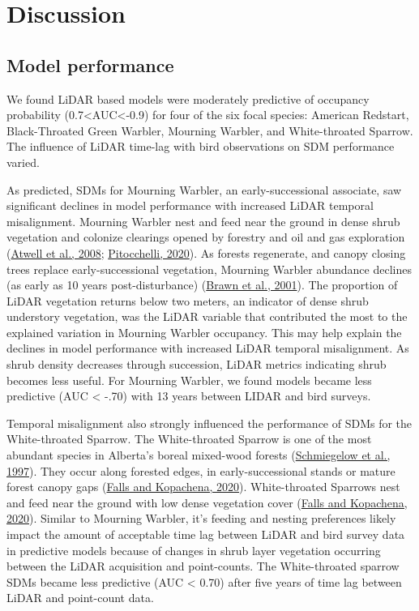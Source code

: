 \documentclass[
  12pt,
]{article}
\begin{document}
\hypertarget{discussion}{%
\section{Discussion}\label{discussion}}

\hypertarget{model-performance}{%
\subsection{Model performance}\label{model-performance}}

We found LiDAR based models were moderately predictive of occupancy probability (0.7\textless AUC\textless-0.9) for four of the six focal species: American Redstart, Black-Throated Green Warbler, Mourning Warbler, and White-throated Sparrow. The influence of LiDAR time-lag with bird observations on SDM performance varied.

As predicted, SDMs for Mourning Warbler, an early-successional associate, saw significant declines in model performance with increased LiDAR temporal misalignment. Mourning Warbler nest and feed near the ground in dense shrub vegetation and colonize clearings opened by forestry and oil and gas exploration (\protect\hyperlink{ref-atwellSongbirdResponseExperimental2008}{Atwell et al., 2008}; \protect\hyperlink{ref-pitocchelliMourningWarblerGeothlypis2020}{Pitocchelli, 2020}). As forests regenerate, and canopy closing trees replace early-successional vegetation, Mourning Warbler abundance declines (as early as 10 years post-disturbance) (\protect\hyperlink{ref-brawnRoleDisturbanceEcology2001}{Brawn et al., 2001}). The proportion of LiDAR vegetation returns below two meters, an indicator of dense shrub understory vegetation, was the LiDAR variable that contributed the most to the explained variation in Mourning Warbler occupancy. This may help explain the declines in model performance with increased LiDAR temporal misalignment. As shrub density decreases through succession, LiDAR metrics indicating shrub becomes less useful. For Mourning Warbler, we found models became less predictive (AUC \textless{} -.70) with 13 years between LIDAR and bird surveys.

Temporal misalignment also strongly influenced the performance of SDMs for the White-throated Sparrow. The White-throated Sparrow is one of the most abundant species in Alberta's boreal mixed-wood forests (\protect\hyperlink{ref-Schmiegelow1997}{Schmiegelow et al., 1997}). They occur along forested edges, in early-successional stands or mature forest canopy gaps (\protect\hyperlink{ref-fallsWhitethroatedSparrowZonotrichia2020}{Falls and Kopachena, 2020}). White-throated Sparrows nest and feed near the ground with low dense vegetation cover (\protect\hyperlink{ref-fallsWhitethroatedSparrowZonotrichia2020}{Falls and Kopachena, 2020}). Similar to Mourning Warbler, it's feeding and nesting preferences likely impact the amount of acceptable time lag between LiDAR and bird survey data in predictive models because of changes in shrub layer vegetation occurring between the LiDAR acquisition and point-counts. The White-throated sparrow SDMs became less predictive (AUC \textless{} 0.70) after five years of time lag between LiDAR and point-count data.
\end{document}
